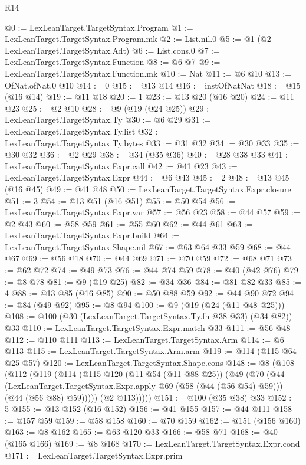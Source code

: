 \begin{lexlean}{R14}
\begin{coremodule}
@0 := LexLeanTarget.TargetSyntax.Program
@1 := LexLeanTarget.TargetSyntax.Program.mk
@2 := List.nil.{0}
@5 := @1 (@2 LexLeanTarget.TargetSyntax.Adt)
@6 := List.cons.{0}
@7 := LexLeanTarget.TargetSyntax.Function
@8 := @6 @7
@9 := LexLeanTarget.TargetSyntax.Function.mk
@10 := Nat
@11 := @6 @10
@13 := OfNat.ofNat.{0} @10
@14 := 0
@15 := @13 @14
@16 := instOfNatNat
@18 := @15 (@16 @14)
@19 := @11 @18
@20 := 1
@23 := @13 @20 (@16 @20)
@24 := @11 @23
@25 := @2 @10
@28 := @9 (@19 (@24 @25))
@29 := LexLeanTarget.TargetSyntax.Ty
@30 := @6 @29
@31 := LexLeanTarget.TargetSyntax.Ty.list
@32 := LexLeanTarget.TargetSyntax.Ty.bytes
@33 := @31 @32
@34 := @30 @33
@35 := @30 @32
@36 := @2 @29
@38 := @34 (@35 @36)
@40 := @28 @38 @33
@41 := LexLeanTarget.TargetSyntax.Expr.call
@42 := @41 @23
@43 := LexLeanTarget.TargetSyntax.Expr
@44 := @6 @43
@45 := 2
@48 := @13 @45 (@16 @45)
@49 := @41 @48
@50 := LexLeanTarget.TargetSyntax.Expr.closure
@51 := 3
@54 := @13 @51 (@16 @51)
@55 := @50 @54
@56 := LexLeanTarget.TargetSyntax.Expr.var
@57 := @56 @23
@58 := @44 @57
@59 := @2 @43
@60 := @58 @59
@61 := @55 @60
@62 := @44 @61
@63 := LexLeanTarget.TargetSyntax.Expr.build
@64 := LexLeanTarget.TargetSyntax.Shape.nil
@67 := @63 @64 @33 @59
@68 := @44 @67
@69 := @56 @18
@70 := @44 @69
@71 := @70 @59
@72 := @68 @71
@73 := @62 @72
@74 := @49 @73
@76 := @44 @74 @59
@78 := @40 (@42 @76)
@79 := @8 @78
@81 := @9 (@19 @25)
@82 := @34 @36
@84 := @81 @82 @33
@85 := 4
@88 := @13 @85 (@16 @85)
@90 := @50 @88 @59
@92 := @44 @90 @72
@94 := @84 (@49 @92)
@95 := @8 @94
@100 := @9 (@19 (@24 (@11 @48 @25)))
@108 := @100 (@30 (LexLeanTarget.TargetSyntax.Ty.fn @38 @33) (@34 @82)) @33
@110 := LexLeanTarget.TargetSyntax.Expr.match @33
@111 := @56 @48
@112 := @110 @111
@113 := LexLeanTarget.TargetSyntax.Arm
@114 := @6 @113
@115 := LexLeanTarget.TargetSyntax.Arm.arm
@119 := @114 (@115 @64 @25 @57)
@120 := LexLeanTarget.TargetSyntax.Shape.cons
@148 := @8
    (@108
      (@112
        (@119
          (@114
            (@115
              @120
              (@11 @54 (@11 @88 @25))
              (@49
                (@70
                  (@44
                    (LexLeanTarget.TargetSyntax.Expr.apply @69 (@58 (@44 (@56 @54) @59)))
                    (@44 (@56 @88) @59)))))
            (@2 @113)))))
@151 := @100 (@35 @38) @33
@152 := 5
@155 := @13 @152 (@16 @152)
@156 := @41 @155
@157 := @44 @111
@158 := @157 @59
@159 := @58 @158
@160 := @70 @159
@162 := @151 (@156 @160)
@163 := @8 @162
@165 := @63 @120 @33
@166 := @58 @71
@168 := @40 (@165 @166)
@169 := @8 @168
@170 := LexLeanTarget.TargetSyntax.Expr.cond
@171 := LexLeanTarget.TargetSyntax.Expr.prim

\end{coremodule}
\end{lexlean}
